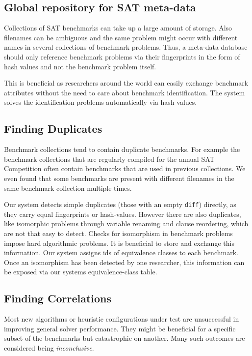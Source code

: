 \documentclass{easychair}
\begin{document}
\subsection{Global repository for SAT meta-data}
\label{sec:fingerprinting}

Collections of SAT benchmarks can take up a large amount of storage. Also filenames can be ambiguous and the same problem might occur with different names in several collections of benchmark problems. Thus, a meta-data database should only reference benchmark problems via their fingerprints in the form of hash values and not the benchmark problem itself.

This is beneficial as researchers around the world can easily exchange benchmark attributes without the need to care about benchmark identification. The system solves the identification problems automatically via hash values. 

\subsection{Finding Duplicates}
\label{sec:duplicates}

Benchmark collections tend to contain duplicate benchmarks. For example the benchmark collections that are regularly compiled for the annual SAT Competition often contain benchmarks that are used in previous collections. We even found that some benchmarks are present with different filenames in the same benchmark collection multiple times. 

Our system detects simple duplicates (those with an empty \texttt{diff}) directly, as they carry equal fingerprints or hash-values. However there are also duplicates, like isomorphic problems through variable renaming and clause reordering, which are not that easy to detect. Checks for isomorphism in benchmark problems impose hard algorithmic problems. It is beneficial to store and exchange this information. Our system assigns ids of equivalence classes to each benchmark. Once an isomorphism has been detected by one researcher, this information can be exposed via our systems equivalence-class table.

\subsection{Finding Correlations}
\label{sec:correlations}

Most new algorithms or heuristic configurations under test are unsuccessful in improving general solver performance. They might be beneficial for a specific subset of the benchmarks but catastrophic on another. 
Many such outcomes are considered being \emph{inconclusive}. 
\end{document}
